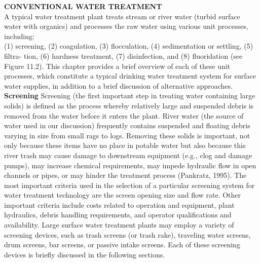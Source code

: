 \textbf{CONVENTIONAL WATER TREATMENT}\\
A typical water treatment plant treats stream or river water (turbid surface water with organics) and processes the raw water using various unit processes, including:\\
(1) screening, (2) coagulation, (3) flocculation, (4) sedimentation or settling, (5) filtra-
tion, (6) hardness treatment, (7) disinfection, and (8) fluoridation (see Figure 11.2). This chapter provides a brief overview of each of these unit processes, which constitute a typical drinking water treatment system for surface water supplies, in addition to a brief discussion of alternative approaches.\\

\textbf{Screening}
Screening (the first important step in treating water containing large solids) is defined as the process whereby relatively large and suspended debris is removed from the water before it enters the plant. River water (the source of water used in our discussion) frequently contains suspended and floating debris varying in size from small rags to logs. Removing these solids is important, not only because these items have no place in potable water but also because this river trash may cause damage to downstream equipment (e.g., clog and damage pumps), may increase chemical requirements, may impede hydraulic flow in open channels or pipes, or may hinder the treatment process (Pankratz, 1995). The most important criteria used in the selection of a particular screening system for water treatment technology are the screen opening size and flow rate. Other important criteria include costs related to operation and equipment, plant hydraulics, debris handling requirements, and operator qualifications and availability. Large surface water treatment plants may employ a variety of screening devices, such as trash screens (or trash rake), traveling water screens, drum screens, bar screens, or passive intake screens. Each of these screening devices is briefly discussed in the following sections.\\
 

